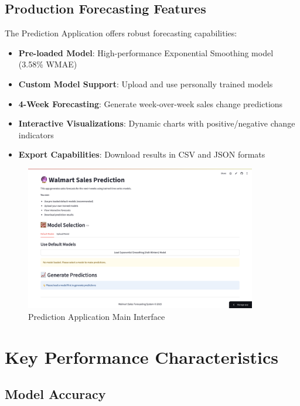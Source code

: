 \subsection{Production Forecasting Features}

The Prediction Application offers robust forecasting capabilities:

\begin{itemize}
    \item \textbf{Pre-loaded Model}: High-performance Exponential Smoothing model (3.58\% WMAE)
    \item \textbf{Custom Model Support}: Upload and use personally trained models
    \item \textbf{4-Week Forecasting}: Generate week-over-week sales change predictions
    \item \textbf{Interactive Visualizations}: Dynamic charts with positive/negative change indicators
    \item \textbf{Export Capabilities}: Download results in CSV and JSON formats
\end{itemize}

\begin{figure}[H]
    \centering
    \includegraphics[width=0.9\textwidth]{Images/01IntroductionAndMainFunction/PredictionInterface.png}
    \caption{Prediction Application Main Interface}
    \label{fig:prediction_interface}
\end{figure}

\section{Key Performance Characteristics}

\subsection{Model Accuracy}

